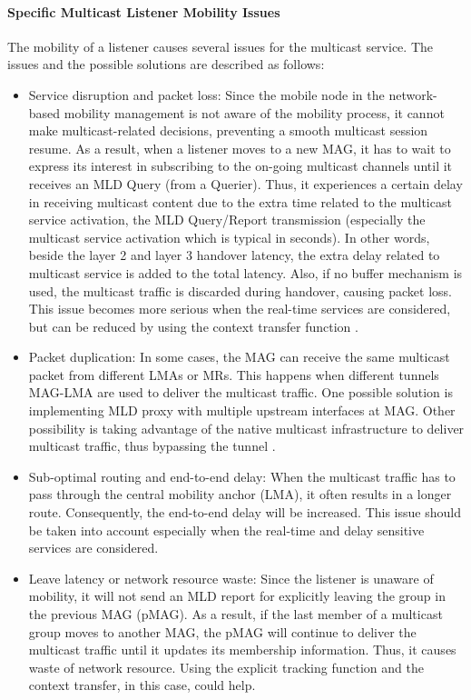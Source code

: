 \paragraph{Specific Multicast Listener Mobility Issues}
The mobility of a listener causes several issues for the multicast service. The issues and the possible solutions are described as follows:
\begin{itemize}
\item  Service disruption and packet loss: Since the mobile node in the network-based mobility management is not aware of the mobility process, it cannot make multicast-related decisions, preventing a smooth multicast session resume. As a result, when a listener moves to a new MAG, it has to wait to express its interest in subscribing to the on-going multicast channels until it receives an MLD Query (from a Querier). Thus, it experiences a certain delay in receiving multicast content due to the extra time related to the multicast service activation, the MLD Query/Report transmission (especially the multicast service activation which is typical in seconds). In other words, beside the layer 2 and layer 3 handover latency, the extra delay related to multicast service is added to the total latency. Also, if no buffer mechanism is used, the multicast traffic is discarded during handover, causing packet loss. This issue becomes more serious when the real-time services are considered, but can be reduced by using the context transfer function \cite{d4.2,d4.3,SIAL}.
\item Packet duplication: In some cases, the MAG can receive the same multicast packet from different LMAs or MRs. This happens when different tunnels MAG-LMA are used to deliver the multicast traffic. One possible solution is implementing MLD proxy with multiple upstream interfaces at MAG. Other possibility is taking advantage of the native multicast infrastructure to deliver multicast traffic, thus bypassing the tunnel \cite{direct_routing_mtma}.  
\item Sub-optimal routing and end-to-end delay: When the multicast traffic has to pass through the central mobility anchor (LMA), it often results in a longer route. Consequently, the end-to-end delay will be increased. This issue should be taken into account especially when the real-time and delay sensitive services are considered. 
\item Leave latency or network resource waste: Since the listener is unaware of mobility, it will not send an MLD report for explicitly leaving the group in the previous MAG (pMAG). As a result, if the last member of a multicast group moves to another MAG, the pMAG will continue to deliver the multicast traffic until it updates its membership information. Thus, it causes waste of network resource. Using the explicit tracking function \cite{explicit_tracking} and the context transfer, in this case, could help. 
\end{itemize}

